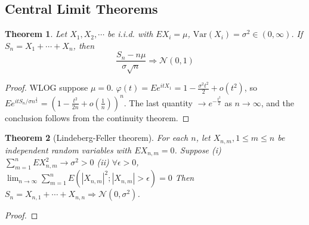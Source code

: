 \documentclass{article}
\newtheorem{Thm}{Theorem}[section]
\theoremstyle{definition}
\begin{document}
\subsection{Central Limit Theorems}
\begin{Thm}
    Let $X_1,X_2,\cdots$ be i.i.d. with $EX_i=\mu$, $\text{Var}(X_i)=\sigma^2\in(0,\infty)$. If $S_n=X_1+\cdots+X_n$, then
    \[\frac{S_n-n\mu}{\sigma \sqrt{n}}\Longrightarrow \mathcal{N}(0,1)\] 
\end{Thm}
\begin{proof}
    WLOG suppose $\mu=0$. $\varphi(t)=Ee^{itX_1}=1-\frac{\sigma^2t^2}{2}+o(t^2)$, so $Ee^{itS_n/\sigma n^{\frac{1}{2}}}=(1-\frac{t^2}{2n}+o(\frac{1}{n}))^n$.
    The last quantity $\to e^{-\frac{t^2}{2}}$ as $n\to\infty$, and the conclusion follows from the continuity theorem.
\end{proof}

\begin{Thm}[Lindeberg-Feller theorem]
    For each $n$, let $X_{n,m},1\le m\le n$ be independent random variables with $EX_{n,m}=0$. Suppose \newline 
    (i) $\sum_{m=1}^n EX_{n,m}^2\to \sigma^2>0$ \newline 
    (ii) $\forall \epsilon>0$, $\lim_{n\to\infty}\sum_{m=1}^nE(\left|X_{n,m}\right|^2;\left|X_{n,m}\right|>\epsilon)=0$ \newline 
    Then $S_n=X_{n,1}+\cdots+X_{n,n}\Longrightarrow \mathcal{N}(0,\sigma^2)$.
\end{Thm}
\begin{proof}
    
\end{proof}
\end{document}
